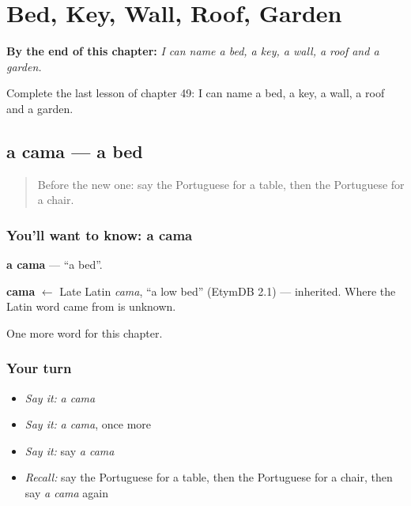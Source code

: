 
\chapter{Bed, Key, Wall, Roof, Garden}
\label{ch:pt-bed-key-wall-roof-garden}

\begin{chapteropening}
\textbf{By the end of this chapter:} \emph{I can name a bed, a key, a wall, a roof and a garden.}

Complete the last lesson of chapter 49: I can name a bed, a key, a wall, a roof and a garden.
\end{chapteropening}

\section[a cama]{a cama — a bed}

\label{lesson:PT-C49-cama}



\begin{quote}
Before the new one: say the Portuguese for a table, then the Portuguese for a chair.
\end{quote}

\subsection*{You'll want to know: a cama}
\textbf{a cama} — \textquotedblleft{}a bed\textquotedblright{}.

\begin{cousinweb}
\textbf{cama} $\leftarrow$ Late Latin \emph{cama}, \textquotedblleft{}a low bed\textquotedblright{} (EtymDB 2.1) — inherited. Where the Latin word came from is unknown.
\end{cousinweb}

\begin{grammarlens}[title={What you've built}]
One more word for this chapter.
\end{grammarlens}

\subsection*{Your turn}
\begin{itemize}
\raggedright
  \item \emph{Say it:} \emph{a cama}
  \item \emph{Say it:} \emph{a cama}, once more
  \item \emph{Say it:} say \emph{a cama}
  \item \emph{Recall:} say the Portuguese for a table, then the Portuguese for a chair, then say \emph{a cama} again
\end{itemize}

